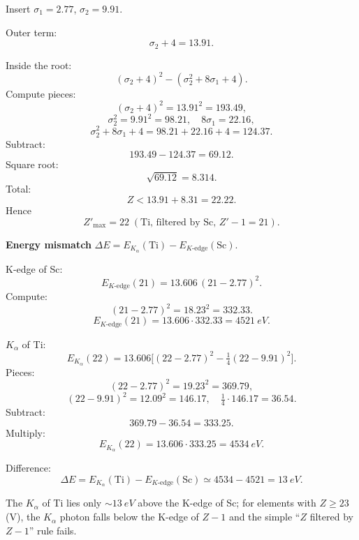 \documentclass[11pt]{article}
\begin{document}
Insert $\sigma_{1}=2.77$, $\sigma_{2}=9.91$.

Outer term:
\[
\sigma_{2}+4=13.91.
\]

Inside the root:
\[
(\sigma_{2}+4)^{2}-(\sigma_{2}^{2}+8\sigma_{1}+4).
\]
Compute pieces:
\[
(\sigma_{2}+4)^{2}=13.91^{2}=193.49,
\]
\[
\sigma_{2}^{2}=9.91^{2}=98.21,\quad 8\sigma_{1}=22.16,
\]
\[
\sigma_{2}^{2}+8\sigma_{1}+4=98.21+22.16+4=124.37.
\]
Subtract:
\[
193.49-124.37=69.12.
\]
Square root:
\[
\sqrt{69.12}=8.314.
\]
Total:
\[
Z<13.91+8.31=22.22.
\]
Hence
\[
\boxed{\;Z'_{\max}=22\;(\text{Ti, filtered by Sc, }Z'-1=21).\;}
\]

\textbf{Energy mismatch} $\Delta E=E_{K_{\alpha}}(\mathrm{Ti})-E_{K\text{-edge}}(\mathrm{Sc})$.

K-edge of Sc:
\[
E_{K\text{-edge}}(21)=13.606\,(21-2.77)^{2}.
\]
Compute:
\[
(21-2.77)^{2}=18.23^{2}=332.33.
\]
\[
E_{K\text{-edge}}(21)=13.606\cdot 332.33=4521\ \si{eV}.
\]

$K_{\alpha}$ of Ti:
\[
E_{K_{\alpha}}(22)=13.606\bigl[(22-2.77)^{2}-\tfrac14(22-9.91)^{2}\bigr].
\]
Pieces:
\[
(22-2.77)^{2}=19.23^{2}=369.79,
\]
\[
(22-9.91)^{2}=12.09^{2}=146.17,\quad \tfrac14\cdot 146.17=36.54.
\]
Subtract:
\[
369.79-36.54=333.25.
\]
Multiply:
\[
E_{K_{\alpha}}(22)=13.606\cdot 333.25=4534\ \si{eV}.
\]

Difference:
\[
\boxed{\;\Delta E=E_{K_{\alpha}}(\mathrm{Ti})-E_{K\text{-edge}}(\mathrm{Sc})\simeq 4534-4521=13\ \si{eV}.\;}
\]

The $K_{\alpha}$ of Ti lies only $\sim\!13\ \si{eV}$ above the K-edge of Sc; for elements with $Z\ge 23$ (V), the $K_{\alpha}$ photon falls below the K-edge of $Z-1$ and the simple ``$Z$ filtered by $Z-1$'' rule fails.
\end{document}
